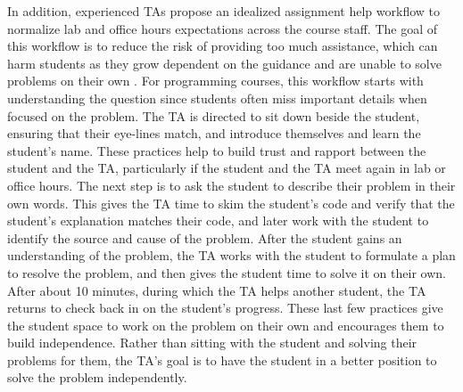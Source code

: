 In addition, experienced TAs propose an idealized assignment help workflow to normalize lab and office hours expectations across the course staff. The goal of this workflow is to reduce the risk of providing too much assistance, which can harm students as they grow dependent on the guidance and are unable to solve problems on their own \cite{Smith:2017}. For programming courses, this workflow starts with understanding the question since students often miss important details when focused on the problem. The TA is directed to sit down beside the student, ensuring that their eye-lines match, and introduce themselves and learn the student's name. These practices help to build trust and rapport between the student and the TA, particularly if the student and the TA meet again in lab or office hours. The next step is to ask the student to describe their problem in their own words. This gives the TA time to skim the student's code and verify that the student's explanation matches their code, and later work with the student to identify the source and cause of the problem. After the student gains an understanding of the problem, the TA works with the student to formulate a plan to resolve the problem, and then gives the student time to solve it on their own. After about 10 minutes, during which the TA helps another student, the TA returns to check back in on the student's progress. These last few practices give the student space to work on the problem on their own and encourages them to build independence. Rather than sitting with the student and solving their problems for them, the TA's goal is to have the student in a better position to solve the problem independently.
